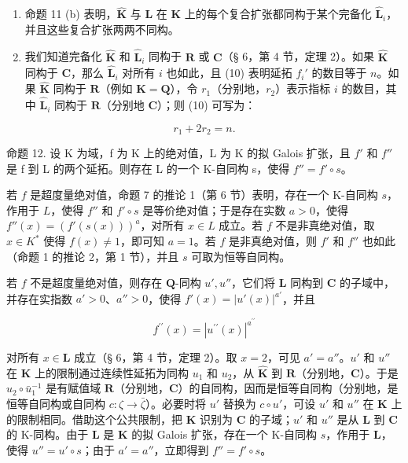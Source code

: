 \begin{enumerate}
\def\labelenumi{(\arabic{enumi})}
\item
  命题 11 (b) 表明，\(\hat{\mathbf{K}}\) 与 \(\mathbf{L}\) 在 \(\mathbf{K}\) 上的每个复合扩张都同构于某个完备化 \(\hat{\mathbf{L}}_i\)，并且这些复合扩张两两不同构。
\item
  我们知道完备化 \(\hat{\mathbf{K}}\) 和 \(\hat{\mathbf{L}}_i\) 同构于 \(\mathbf{R}\) 或 \(\mathbf{C}\)（§ 6，第 4 节，定理 2）。如果 \(\hat{\mathbf{K}}\) 同构于 \(\mathbf{C}\)，那么 \(\hat{\mathbf{L}}_i\) 对所有 \(i\) 也如此，且 (10) 表明延拓 \(f_i'\) 的数目等于 \(n\)。如果 \(\hat{\mathbf{K}}\) 同构于 \(\mathbf{R}\)（例如 \(\mathbf{K} = \mathbf{Q}\)），令 \(r_1\)（分别地，\(r_2\)）表示指标 \(i\) 的数目，其中 \(\hat{\mathbf{L}}_i\) 同构于 \(\mathbf{R}\)（分别地 \(\mathbf{C}\)）；则 (10) 可写为：
\end{enumerate}

\[
r _ {1} + 2 r _ {2} = n.\tag{11}
\]

命题 12. 设 K 为域，f 为 K 上的绝对值，L 为 K 的拟 Galois 扩张，且 \(f'\) 和 \(f''\) 是 f 到 L 的两个延拓。则存在 L 的一个 K-自同构 s，使得 \(f'' = f' \circ s\)。

若 \(f\) 是超度量绝对值，命题 7 的推论 1（第 6 节）表明，存在一个 K-自同构 \(s\)，作用于 \(L\)，使得 \(f''\) 和 \(f' \circ s\) 是等价绝对值；于是存在实数 \(a > 0\)，使得 \(f''(x) = (f'(s(x)))^a\)，对所有 \(x \in L\) 成立。若 \(f\) 不是非真绝对值，取 \(x \in K^*\) 使得 \(f(x) \neq 1\)，即可知 \(a = 1\)。若 \(f\) 是非真绝对值，则 \(f'\) 和 \(f''\) 也如此（命题 1 的推论 2，第 1 节），并且 \(s\) 可取为恒等自同构。

若 \(f\) 不是超度量绝对值，则存在 \(\mathbf{Q}\)-同构 \(u', u''\)，它们将 \(\mathbf{L}\) 同构到 \(\mathbf{C}\) 的子域中，并存在实指数 \(a' > 0\)、\(a'' > 0\)，使得 \(f'(x) = |u'(x)|^{a'}\)，并且

\[
f ^ {\prime \prime} (x) = | u ^ {\prime \prime} (x) | ^ {a ^ {\prime \prime}}
\]

对所有 \(x \in \mathbf{L}\) 成立（§ 6，第 4 节，定理 2）。取 \(x = 2\)，可见 \(a' = a''\)。\(u'\) 和 \(u''\) 在 \(\mathbf{K}\) 上的限制通过连续性延拓为同构 \(u_1\) 和 \(u_2\)，从 \(\hat{\mathbf{K}}\) 到 \(\mathbf{R}\)（分别地，\(\mathbf{C}\)）。于是 \(u_2 \circ \bar{u}_1^{-1}\) 是有赋值域 \(\mathbf{R}\)（分别地，\(\mathbf{C}\)）的自同构，因而是恒等自同构（分别地，是恒等自同构或自同构 \(c: \zeta \to \bar{\zeta}\)）。必要时将 \(u'\) 替换为 \(c \circ u'\)，可设 \(u'\) 和 \(u''\) 在 \(\mathbf{K}\) 上的限制相同。借助这个公共限制，把 \(\mathbf{K}\) 识别为 \(\mathbf{C}\) 的子域；\(u'\) 和 \(u''\) 是从 \(\mathbf{L}\) 到 \(\mathbf{C}\) 的 K-同构。由于 \(\mathbf{L}\) 是 \(\mathbf{K}\) 的拟 Galois 扩张，存在一个 K-自同构 \(s\)，作用于 \(\mathbf{L}\)，使得 \(u'' = u' \circ s\)；由于 \(a' = a''\)，立即得到 \(f'' = f' \circ s\)。

